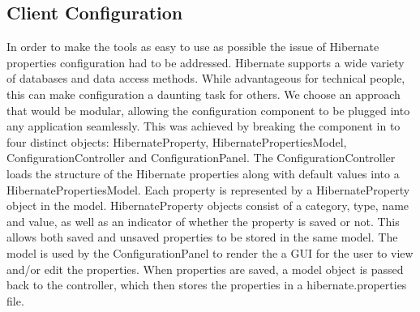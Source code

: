 \subsection{Client Configuration}
In order to make the tools as easy to use as possible the issue of Hibernate properties configuration had to be addressed. Hibernate supports a wide variety of databases and data access methods. While advantageous for technical people, this can make configuration a daunting task for others. We choose an approach that would be modular, allowing the configuration component to be plugged into any application seamlessly. This was achieved by breaking the component in to four distinct objects: HibernateProperty, HibernatePropertiesModel, ConfigurationController and ConfigurationPanel. The ConfigurationController loads the structure of the Hibernate properties along with default values into a HibernatePropertiesModel. Each property is represented by a HibernateProperty object in the model. HibernateProperty objects consist of a category, type, name and value, as well as an indicator of whether the property is saved or not. This allows both saved and unsaved properties to be stored in the same model. The model is used by the ConfigurationPanel to render the a GUI for the user to view and/or edit the properties. When properties are saved, a model object is passed back to the controller, which then stores the properties in a hibernate.properties file.

